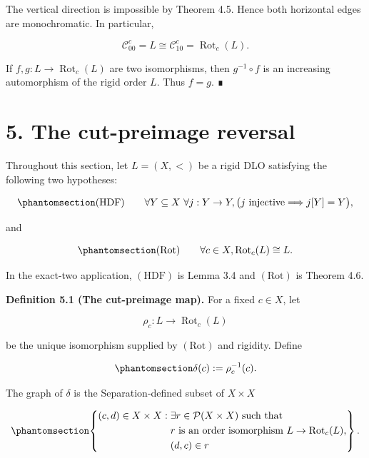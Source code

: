 \documentclass[
  english,
  11pt,
  reqno]{amsart}
\begin{document}
The vertical direction is impossible by Theorem 4.5. Hence both
horizontal edges are monochromatic. In particular,

\[
\mathcal C_{00}^c
=
L
\cong
\mathcal C_{10}^c
=
\operatorname{Rot}_c(L).
\]

If \(f,g:L\to\operatorname{Rot}_c(L)\) are two isomorphisms, then
\(g^{-1}\circ f\) is an increasing automorphism of the rigid order
\(L\). Thus \(f=g\). ∎

\protect{}\label{sec:cut-preimage}

\section{5. The cut-preimage reversal}\label{the-cut-preimage-reversal}

Throughout this section, let \(L=(X,<)\) be a rigid DLO satisfying the
following two hypotheses:

\begin{equation}\protect\phantomsection\label{eq:hereditary-dedekind-finiteness}{
(\mathrm{HDF})
\qquad
\forall Y\subseteq X\ \forall j:Y\to Y,
\bigl(j\text{ injective}\Longrightarrow j[Y]=Y\bigr),
}\end{equation}

and

\begin{equation}\protect\phantomsection\label{eq:rotation-hypothesis}{
(\mathrm{Rot})
\qquad
\forall c\in X,
\operatorname{Rot}_c(L)\cong L.
}\end{equation}

In the exact-two application, \((\mathrm{HDF})\) is Lemma 3.4 and
\((\mathrm{Rot})\) is Theorem 4.6.

\protect{}\label{def:5-1-cut-preimage}

\textbf{Definition 5.1 (The cut-preimage map).} For a fixed \(c\in X\),
let

\[
\rho_c:
L
\longrightarrow
\operatorname{Rot}_c(L)
\]

be the unique isomorphism supplied by \((\mathrm{Rot})\) and rigidity.
Define

\begin{equation}\protect\phantomsection\label{eq:cut-preimage}{
\delta(c):=\rho_c^{-1}(c).
}\end{equation}

The graph of \(\delta\) is the Separation-defined subset of
\(X\times X\)

\begin{equation}\protect\phantomsection\label{eq:cut-preimage-graph}{
\left\{
\begin{aligned}
(c,d)\in X\times X:\;&
\exists r\in\mathcal P(X\times X)\ \text{such that}\\
&r\text{ is an order isomorphism }L\to\operatorname{Rot}_c(L),\\
&(d,c)\in r
\end{aligned}
\right\}.
}\end{equation}
\end{document}
